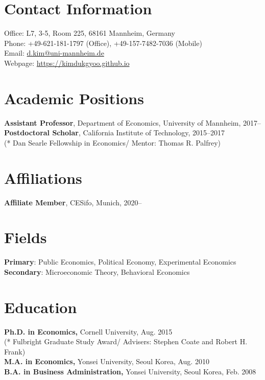 \documentclass[margin, letterpaper]{res}
\begin{document}
 

\begin{resume} 
\section{Contact Information} Office: L7, 3-5, Room 225, 68161 Mannheim, Germany\\
Phone: +49-621-181-1797 (Office), +49-157-7482-7036 (Mobile)\\
Email: \href{mailto:d.kim@uni-mannheim.de}{d.kim@uni-mannheim.de}\\
Webpage: \url{https://kimdukgyoo.github.io}

\section{Academic Positions}
\textbf{Assistant Professor}, Department of Economics, University of Mannheim, 2017--\\
\textbf{Postdoctoral Scholar}, California Institute of Technology, 2015--2017\\
(* Dan Searle Fellowship in Economics/ Mentor: Thomas R. Palfrey)

\section{Affiliations}
\textbf{Affiliate Member}, CESifo, Munich, 2020--

\section{Fields}
\textbf{Primary}: Public Economics, Political Economy, Experimental Economics\\
\textbf{Secondary}: Microeconomic Theory, Behavioral Economics

\section{Education} 
\textbf{Ph.D. in Economics,} Cornell University, Aug. 2015\\
(* Fulbright Graduate Study Award/ Advisers: Stephen Coate and Robert H. Frank)\\
\textbf{M.A. in Economics,} Yonsei University, Seoul Korea,  Aug. 2010\\
\textbf{B.A. in Business Administration,} Yonsei University, Seoul Korea, Feb. 2008


\end{resume}
\end{document}
